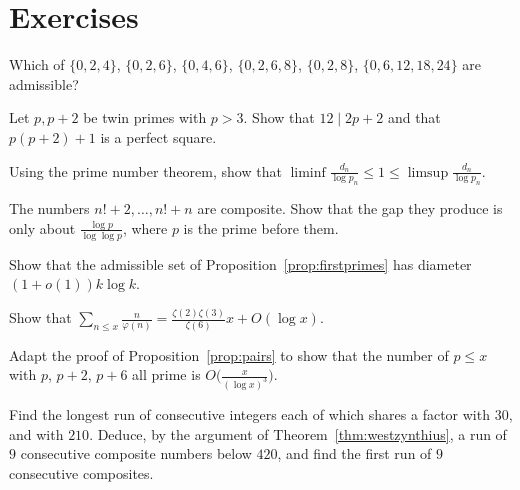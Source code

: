 \section{Exercises}

\begin{exercise}[$\star$]\label{ex:admissible2}
Which of $\{0,2,4\}$, $\{0,2,6\}$, $\{0,4,6\}$, $\{0,2,6,8\}$, $\{0,2,8\}$, $\{0,6,12,18,24\}$ are admissible?
\end{exercise}

\begin{exercise}[$\star$]\label{ex:twin12}
Let $p,p+2$ be twin primes with $p>3$. Show that $12\mid2p+2$ and that $p(p+2)+1$ is a perfect square.
\end{exercise}

\begin{exercise}[$\star$]\label{ex:averagegap}
Using the prime number theorem, show that $\liminf\frac{d_n}{\log p_n}\le1\le\limsup\frac{d_n}{\log p_n}$.
\end{exercise}

\begin{exercise}[$\star$]\label{ex:factorial}
The numbers $n!+2,\dots,n!+n$ are composite. Show that the gap they produce is only about $\frac{\log p}{\log\log p}$, where $p$ is the prime before them.
\end{exercise}

\begin{exercise}[$\star$]\label{ex:diameter}
Show that the admissible set of Proposition~\ref{prop:firstprimes} has diameter $(1+o(1))k\log k$.
\end{exercise}

\begin{exercise}[$\star\star$]\label{ex:hphiavg}
Show that $\sum_{n\le x}\frac n{\varphi(n)}=\frac{\zeta(2)\zeta(3)}{\zeta(6)}x+O(\log x)$.
\end{exercise}

\begin{exercise}[$\star\star$]\label{ex:triplesieve}
Adapt the proof of Proposition~\ref{prop:pairs} to show that the number of $p\le x$ with $p$, $p+2$, $p+6$ all prime is $O\bigl(\frac x{(\log x)^3}\bigr)$.
\end{exercise}

\begin{exercise}[$\star\star$]\label{ex:jacobsthal}
Find the longest run of consecutive integers each of which shares a factor with $30$, and with $210$. Deduce, by the argument of
Theorem~\ref{thm:westzynthius}, a run of $9$ consecutive composite numbers below $420$, and find the first run of $9$ consecutive composites.
\end{exercise}

